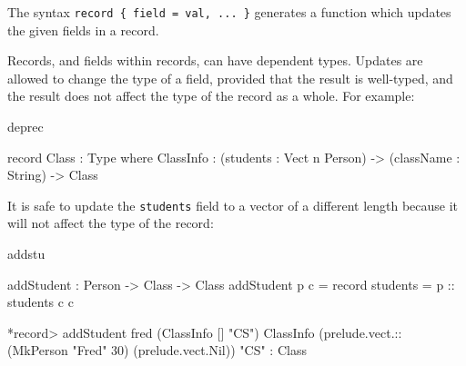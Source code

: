\noindent
The syntax \texttt{record \{ field = val, ... \}} generates a function which updates
the given fields in a record. 

Records, and fields within records, can have dependent types.
Updates are allowed to change the type of a field,
provided that the result is well-typed, and the result does not affect the type of
the record as a whole. For example:

\begin{SaveVerbatim}{deprec}

record Class : Type where
    ClassInfo : (students : Vect n Person) ->
                (className : String) ->
                Class

\end{SaveVerbatim}

\noindent
It is safe to update the \texttt{students} field to a vector of a different length
because it will not affect the type of the record:

\begin{SaveVerbatim}{addstu}

addStudent : Person -> Class -> Class
addStudent p c = record { students = p :: students c } c

*record> addStudent fred (ClassInfo [] "CS")
ClassInfo (prelude.vect.:: (MkPerson "Fred" 30) (prelude.vect.Nil)) "CS" 
  : Class

\end{SaveVerbatim}

